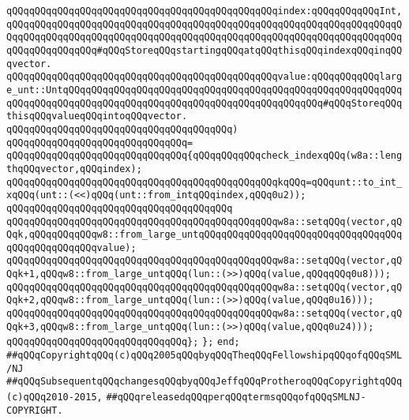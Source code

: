 \verb|qQQqqQQqqQQqqQQqqQQqqQQqqQQqqQQqqQQqqQQqqQQqqQQqindex:qQQqqQQqqQQqInt,qQQqqQQqqQQqqQQqqQQqqQQqqQQqqQQqqQQqqQQqqQQqqQQqqQQqqQQqqQQqqQQqqQQqqQQqqQQqqQQqqQQqqQQqqQQqqQQqqQQqqQQqqQQqqQQqqQQqqQQqqQQqqQQqqQQqqQQqqQQqqQQqqQQqqQQqqQQq#qQQqStoreqQQqstartingqQQqatqQQqthisqQQqindexqQQqinqQQqvector.|\newline
\verb|qQQqqQQqqQQqqQQqqQQqqQQqqQQqqQQqqQQqqQQqqQQqqQQqvalue:qQQqqQQqqQQqlarge_unt::UntqQQqqQQqqQQqqQQqqQQqqQQqqQQqqQQqqQQqqQQqqQQqqQQqqQQqqQQqqQQqqQQqqQQqqQQqqQQqqQQqqQQqqQQqqQQqqQQqqQQqqQQqqQQqqQQqqQQq#qQQqStoreqQQqthisqQQqvalueqQQqintoqQQqvector.|\newline
\verb|qQQqqQQqqQQqqQQqqQQqqQQqqQQqqQQqqQQqqQQq)|\newline
\verb|qQQqqQQqqQQqqQQqqQQqqQQqqQQqqQQq=|\newline
\verb|qQQqqQQqqQQqqQQqqQQqqQQqqQQqqQQq{qQQqqQQqqQQqcheck_indexqQQq(w8a::lengthqQQqvector,qQQqindex);|\newline
\newline
\verb|qQQqqQQqqQQqqQQqqQQqqQQqqQQqqQQqqQQqqQQqqQQqqQQqkqQQq=qQQqunt::to_int_xqQQq(unt::(<<)qQQq(unt::from_intqQQqindex,qQQq0u2));|\newline
\verb|qQQqqQQqqQQqqQQqqQQqqQQqqQQqqQQqqQQqqQQq|\newline
\verb|qQQqqQQqqQQqqQQqqQQqqQQqqQQqqQQqqQQqqQQqqQQqqQQqw8a::setqQQq(vector,qQQqk,qQQqqQQqqQQqw8::from_large_untqQQqqQQqqQQqqQQqqQQqqQQqqQQqqQQqqQQqqQQqqQQqqQQqqQQqvalue);|\newline
\verb|qQQqqQQqqQQqqQQqqQQqqQQqqQQqqQQqqQQqqQQqqQQqqQQqw8a::setqQQq(vector,qQQqk+1,qQQqw8::from_large_untqQQq(lun::(>>)qQQq(value,qQQqqQQq0u8)));|\newline
\verb|qQQqqQQqqQQqqQQqqQQqqQQqqQQqqQQqqQQqqQQqqQQqqQQqw8a::setqQQq(vector,qQQqk+2,qQQqw8::from_large_untqQQq(lun::(>>)qQQq(value,qQQq0u16)));|\newline
\verb|qQQqqQQqqQQqqQQqqQQqqQQqqQQqqQQqqQQqqQQqqQQqqQQqw8a::setqQQq(vector,qQQqk+3,qQQqw8::from_large_untqQQq(lun::(>>)qQQq(value,qQQq0u24)));|\newline
\verb|qQQqqQQqqQQqqQQqqQQqqQQqqQQqqQQq};|\newline
\newline
\verb|};|\newline
\verb|end;|\newline
\newline
\newline
\newline
\verb|##qQQqCopyrightqQQq(c)qQQq2005qQQqbyqQQqTheqQQqFellowshipqQQqofqQQqSML/NJ|\newline
\verb|##qQQqSubsequentqQQqchangesqQQqbyqQQqJeffqQQqProtheroqQQqCopyrightqQQq(c)qQQq2010-2015,|\newline
\verb|##qQQqreleasedqQQqperqQQqtermsqQQqofqQQqSMLNJ-COPYRIGHT.|\newline

